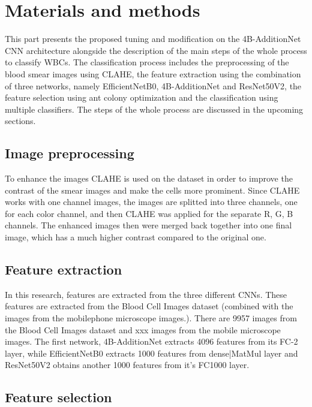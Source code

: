 \section{Materials and methods}

This part presents the proposed tuning and modification on the 4B-AdditionNet
CNN architecture alongside the description of the main steps of the whole process to classify WBCs. The classification process includes the preprocessing of the blood smear images using CLAHE, the feature extraction using the combination of three networks, namely EfficientNetB0, 4B-AdditionNet and ResNet50V2, the feature selection using ant colony optimization and the classification using multiple classifiers. The steps of the whole process are discussed in the upcoming sections.

\subsection{Image preprocessing}

To enhance the images CLAHE
is used on the dataset in order to improve the contrast of the smear images and make the cells more prominent. Since CLAHE works with one channel images, the images are splitted into three channels, one for each color channel, and then CLAHE was applied for the separate R, G, B channels. The enhanced images then were merged back together into one final image, which has a much higher contrast compared to the original one.

\subsection{Feature extraction}
In this research, features are extracted from the three different CNNs. These features are extracted from the Blood Cell Images dataset (combined with the images from the mobilephone microscope images.). There are 9957 images from the Blood Cell Images dataset and xxx images from the mobile microscope images. The first network, 4B-AdditionNet extracts 4096 features from its FC-2 layer, while EfficientNetB0 extracts 1000 features from dense|MatMul layer and ResNet50V2 obtains another 1000 features from it's FC1000 layer.


\subsection{Feature selection}

